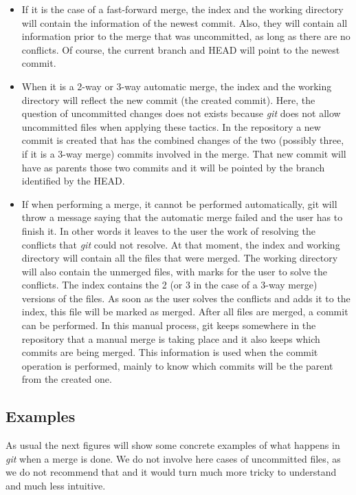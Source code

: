 \begin{itemize}
\item If it is the case of a fast-forward merge, the index and the working directory
will contain the information of the newest commit. Also, they will contain all 
information prior to the merge that was uncommitted, as long as there
are no conflicts. Of course, the current branch and HEAD will point to the
newest commit.

\item When it is a 2-way or 3-way automatic merge, the
index and the working directory will reflect the new
commit (the created commit). Here, the question of 
uncommitted changes does not exists because \emph{git} 
does not allow uncommitted files when applying these tactics. 
In the repository a new commit is created that has the combined
changes of the two (possibly three, if it is a 3-way merge) 
commits involved in the merge. That new commit will have as 
parents those two commits and it will be pointed by the
branch identified by the HEAD.

\item If when performing a merge, it cannot be performed
automatically, git will throw a message saying that the 
automatic merge failed and the user has to finish it. In 
other words it leaves to the user the work of resolving the conflicts
that \emph{git} could not resolve. At that moment, the index and working directory
will contain all the files that were merged. The working directory
will also contain the unmerged files, with marks for the user to solve
the conflicts. The index contains the 2 (or 3 in the case of a 3-way
merge) versions of the files. As soon as the user solves the conflicts
and adds it to the index, this file will be marked as merged. After
all files are merged, a commit can be performed. In this manual
process, git keeps somewhere in the repository that a manual merge is
taking place and it also keeps which commits are being merged. This
information is used when the commit operation is performed, mainly to
know which commits will be the parent from the created one. 

\end{itemize}

\subsection{Examples}

As usual the next figures will show some concrete examples of what happens
in \emph{git} when a merge is done. We do not involve here cases of 
uncommitted files, as we do not recommend that and 
it would turn much more tricky to understand and much less intuitive. \\


